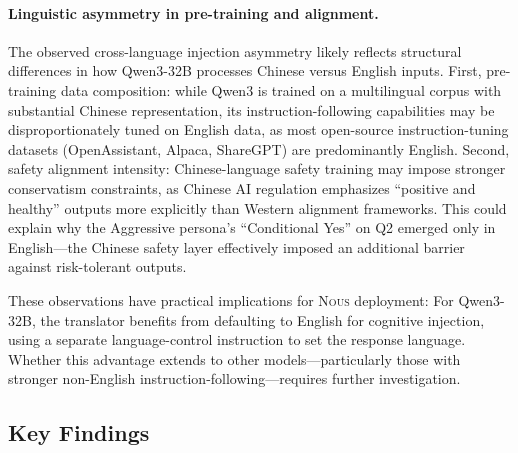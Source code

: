 \documentclass[11pt]{article}
\newcommand{\nous}{\textsc{Nous}}
\begin{document}
\paragraph{Linguistic asymmetry in pre-training and alignment.}
The observed cross-language injection asymmetry likely reflects structural differences in how Qwen3-32B processes Chinese versus English inputs. First, pre-training data composition: while Qwen3 is trained on a multilingual corpus with substantial Chinese representation, its instruction-following capabilities may be disproportionately tuned on English data, as most open-source instruction-tuning datasets (OpenAssistant, Alpaca, ShareGPT) are predominantly English. Second, safety alignment intensity: Chinese-language safety training may impose stronger conservatism constraints, as Chinese AI regulation emphasizes ``positive and healthy'' outputs more explicitly than Western alignment frameworks. This could explain why the Aggressive persona's ``Conditional Yes'' on Q2 emerged only in English---the Chinese safety layer effectively imposed an additional barrier against risk-tolerant outputs.

These observations have practical implications for \nous{} deployment: For Qwen3-32B, the translator benefits from defaulting to English for cognitive injection, using a separate language-control instruction to set the response language. Whether this advantage extends to other models---particularly those with stronger non-English instruction-following---requires further investigation.

\subsection{Key Findings}
\end{document}
